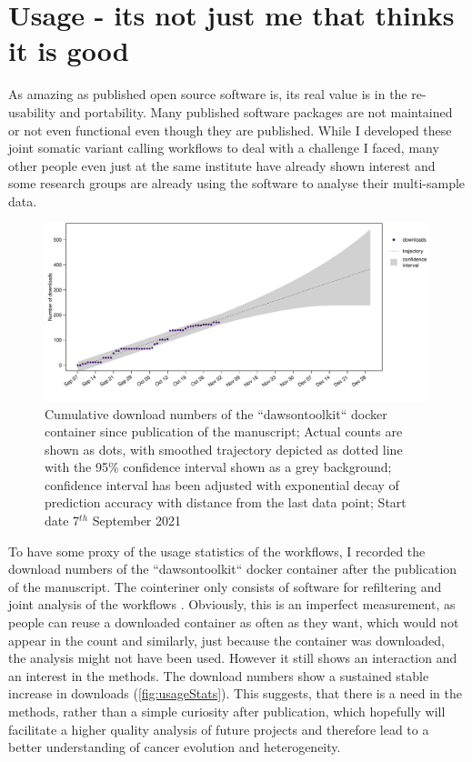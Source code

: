\section[Usage]{Usage - its not just me that thinks it is good}
\label{variantcalling-sec:usage}
As amazing as published open source software is, its real value is in the re-usability and portability. Many published software packages are not maintained or not even functional even though they are published. While I developed these joint somatic variant calling workflows to deal with a challenge I faced, many other people even just at the same institute have already shown interest and some research groups are already using the software to analyse their multi-sample data.

\begin{figure}[!ht]
\centering
\includegraphics[width=.99\linewidth]{Figures/dawsontoolkitDownloads.pdf}
\caption[Usage statistics joint workflows]{Cumulative download numbers of the ``dawsontoolkit`` docker container since publication of the manuscript; Actual counts are shown as dots, with smoothed trajectory depicted as dotted line with the 95\% confidence interval shown as a grey background; confidence interval has been adjusted with exponential decay of prediction accuracy with distance from the last data point; Start date 7$^{th}$ September 2021}\label{fig:usageStats}
\end{figure}

To have some proxy of the usage statistics of the workflows, I recorded the download numbers of the ``dawsontoolkit`` docker container after the publication of the manuscript. The cointeriner only consists of software for refiltering and joint analysis of the workflows . Obviously, this is an imperfect measurement, as people can reuse a downloaded container as often as they want, which would not appear in the count and similarly, just because the container was downloaded, the analysis might not have been used. However it still shows  an interaction and an interest in the methods. The download numbers show a sustained stable increase in downloads (\autoref{fig:usageStats}). This suggests, that there is a need in the methods, rather than a simple curiosity after publication, which hopefully will facilitate a higher quality analysis of future projects and therefore lead to a better understanding of cancer evolution and heterogeneity.

